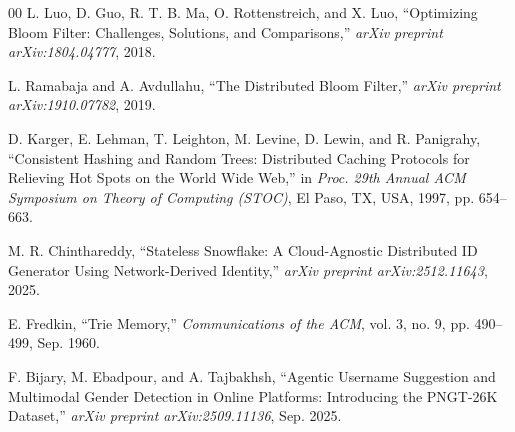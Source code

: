 \documentclass[conference]{IEEEtran}
\begin{document}
\begin{thebibliography}{00}
 L. Luo, D. Guo, R. T. B. Ma, O. Rottenstreich, and X. Luo, ``Optimizing Bloom Filter: Challenges, Solutions, and Comparisons,'' \emph{arXiv preprint arXiv:1804.04777}, 2018.

 L. Ramabaja and A. Avdullahu, ``The Distributed Bloom Filter,'' \emph{arXiv preprint arXiv:1910.07782}, 2019.

 D. Karger, E. Lehman, T. Leighton, M. Levine, D. Lewin, and R. Panigrahy, ``Consistent Hashing and Random Trees: Distributed Caching Protocols for Relieving Hot Spots on the World Wide Web,'' in \emph{Proc. 29th Annual ACM Symposium on Theory of Computing (STOC)}, El Paso, TX, USA, 1997, pp. 654--663.

 M. R. Chinthareddy, ``Stateless Snowflake: A Cloud-Agnostic Distributed ID Generator Using Network-Derived Identity,'' \textit{arXiv preprint arXiv:2512.11643}, 2025.

 E. Fredkin, ``Trie Memory,'' \textit{Communications of the ACM}, vol. 3, no. 9, pp. 490--499, Sep. 1960.

 F. Bijary, M. Ebadpour, and A. Tajbakhsh, ``Agentic Username Suggestion and Multimodal Gender Detection in Online Platforms: Introducing the PNGT-26K Dataset,'' \textit{arXiv preprint arXiv:2509.11136}, Sep. 2025.

\end{thebibliography}
\end{document}
